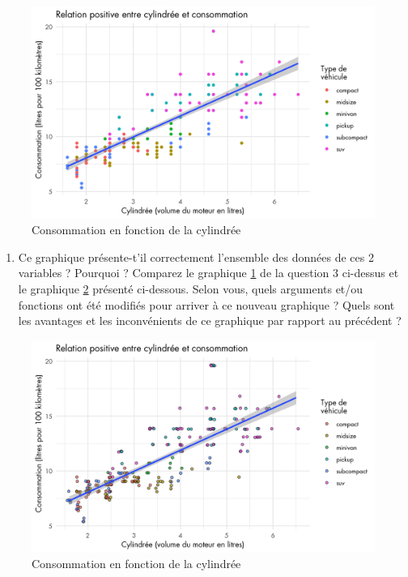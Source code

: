\documentclass[a4paperpaper,]{article}
\providecommand{\tightlist}{%
  \setlength{\itemsep}{0pt}\setlength{\parskip}{0pt}}
\begin{document}
\begin{figure}[htpb]

{\centering \includegraphics[width=0.9\linewidth]{figure/consommation-1} 

}

\caption{Consommation en fonction de la cylindrée}\label{fig:consommation}
\end{figure}

\begin{enumerate}
\def\labelenumi{\arabic{enumi}.}
\setcounter{enumi}{3}
\tightlist
\item
  Ce graphique présente-t'il correctement l'ensemble des données de ces 2 variables ? Pourquoi ? Comparez le graphique \ref{fig:consommation} de la question 3 ci-dessus et le graphique \ref{fig:consommation2} présenté ci-dessous. Selon vous, quels arguments et/ou fonctions ont été modifiés pour arriver à ce nouveau graphique ? Quels sont les avantages et les inconvénients de ce graphique par rapport au précédent ?
\end{enumerate}

\begin{figure}[htpb]

{\centering \includegraphics[width=0.9\linewidth]{figure/consommation2-1} 

}

\caption{Consommation en fonction de la cylindrée}\label{fig:consommation2}
\end{figure}
\end{document}
